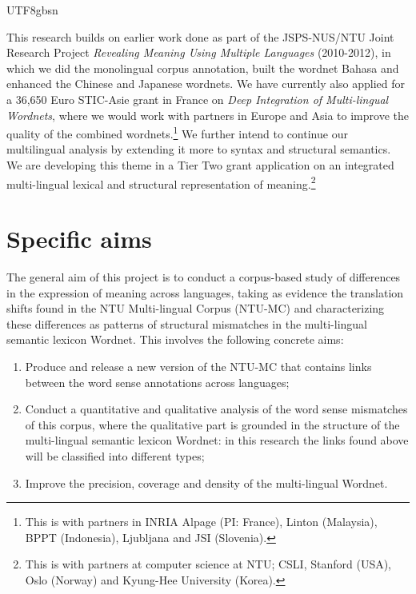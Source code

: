 \documentclass[12pt]{book} %
\begin{document}
\begin{CJK}{UTF8}{gbsn}


This research builds on earlier work done as part of the JSPS-NUS/NTU
Joint Research Project \textit{Revealing Meaning Using Multiple
  Languages} (2010-2012), in which we did the monolingual corpus
annotation, built the wordnet Bahasa and enhanced the Chinese and
Japanese wordnets.  We have currently also applied for a 36,650 Euro
STIC-Asie grant in France on \textit{Deep Integration of Multi-lingual
  Wordnets}, where we would work with partners in Europe and Asia to
improve the quality of the combined wordnets.\footnote{This is with
  partners in INRIA Alpage (PI: France), Linton (Malaysia), BPPT
  (Indonesia), Ljubljana and JSI (Slovenia).}  We further intend
to continue our multilingual analysis by extending it more to syntax
and structural semantics.  We are developing this theme in a Tier Two
grant application on an integrated multi-lingual lexical and
structural representation of meaning.\footnote{This is with partners
  at computer science at NTU; CSLI, Stanford (USA), Oslo (Norway) and
  Kyung-Hee University (Korea).}


\section{Specific aims}
The general aim of this project is to conduct a corpus-based study of
differences in the expression of meaning across languages, taking
as evidence the translation shifts found in the NTU Multi-lingual
Corpus (NTU-MC) and characterizing these differences as patterns of
structural mismatches in the multi-lingual semantic lexicon Wordnet.
This involves the following concrete aims:
\begin{enumerate}
\item Produce and release a new version of the NTU-MC that contains
  links between the word sense annotations across
  languages;
\item Conduct a quantitative and qualitative analysis of the word
  sense mismatches of this corpus, where the qualitative part is
  grounded in the structure of the multi-lingual semantic lexicon
  Wordnet: in this research the links found above will be classified
  into different types;
\item Improve the precision, coverage and density of the multi-lingual
  Wordnet.
\end{enumerate}



\end{CJK}
\end{document}

